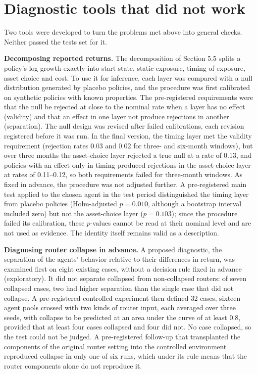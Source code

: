 \documentclass[12pt,a4paper]{report}
\begin{document}
\section{Diagnostic tools that did not
work}\label{diagnostic-tools-that-did-not-work}

Two tools were developed to turn the problems met above into general
checks. Neither passed the tests set for it.

\textbf{Decomposing reported returns.} The decomposition of Section 5.5
splits a policy's log growth exactly into start state, static exposure,
timing of exposure, asset choice and cost. To use it for inference, each
layer was compared with a null distribution generated by placebo
policies, and the procedure was first calibrated on synthetic policies
with known properties. The pre-registered requirements were that the
null be rejected at close to the nominal rate when a layer has no effect
(validity) and that an effect in one layer not produce rejections in
another (separation). The null design was revised after failed
calibrations, each revision registered before it was run. In the final
version, the timing layer met the validity requirement (rejection rates
0.03 and 0.02 for three- and six-month windows), but over three months
the asset-choice layer rejected a true null at a rate of 0.13, and
policies with an effect only in timing produced rejections in the
asset-choice layer at rates of 0.11--0.12, so both requirements failed
for three-month windows. As fixed in advance, the procedure was not
adjusted further. A pre-registered main test applied to the chosen agent
in the test period distinguished the timing layer from placebo policies
(Holm-adjusted \(p = 0.010\), although a bootstrap interval included
zero) but not the asset-choice layer (\(p = 0.103\)); since the
procedure failed its calibration, these \(p\)-values cannot be read at
their nominal level and are not used as evidence. The identity itself
remains valid as a description.

\textbf{Diagnosing router collapse in advance.} A proposed diagnostic,
the separation of the agents' behavior relative to their differences in
return, was examined first on eight existing cases, without a decision
rule fixed in advance (exploratory). It did not separate collapsed from
non-collapsed routers: of seven collapsed cases, two had higher
separation than the single case that did not collapse. A pre-registered
controlled experiment then defined 32 cases, sixteen agent pools crossed
with two kinds of router input, each averaged over three seeds, with
collapse to be predicted at an area under the curve of at least 0.8,
provided that at least four cases collapsed and four did not. No case
collapsed, so the test could not be judged. A pre-registered follow-up
that transplanted the components of the original router setting into the
controlled environment reproduced collapse in only one of six runs,
which under its rule means that the router components alone do not
reproduce it.
\end{document}
